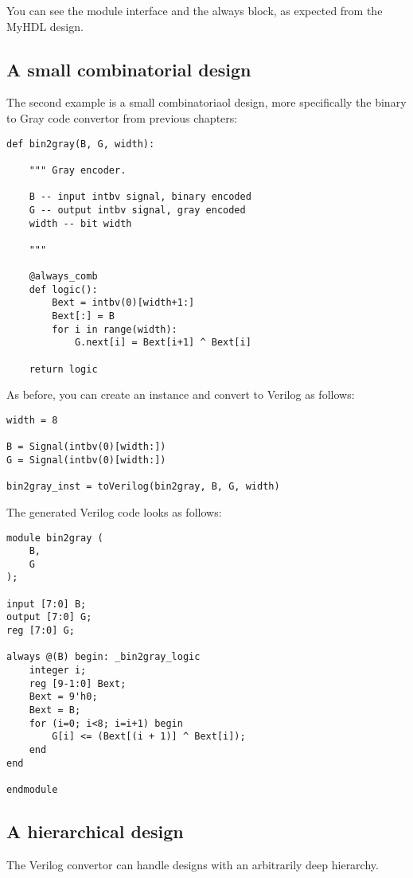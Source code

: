 You can see the module interface and the always block, as expected
from the MyHDL design. 

\subsection{A small combinatorial design\label{conv-usage-comb}}

The second example is a small combinatoriaol design, more
specifically the binary to Gray code convertor from previous chapters:

\begin{verbatim}
def bin2gray(B, G, width):
    
    """ Gray encoder.

    B -- input intbv signal, binary encoded
    G -- output intbv signal, gray encoded
    width -- bit width
    
    """

    @always_comb
    def logic():
        Bext = intbv(0)[width+1:]
        Bext[:] = B
        for i in range(width):
            G.next[i] = Bext[i+1] ^ Bext[i]

    return logic
\end{verbatim}

As before, you can create an instance and convert to
Verilog as follows:

\begin{verbatim}
width = 8

B = Signal(intbv(0)[width:])
G = Signal(intbv(0)[width:])

bin2gray_inst = toVerilog(bin2gray, B, G, width)
 \end{verbatim}

The generated Verilog code looks as follows:

\begin{verbatim}
module bin2gray (
    B,
    G
);

input [7:0] B;
output [7:0] G;
reg [7:0] G;

always @(B) begin: _bin2gray_logic
    integer i;
    reg [9-1:0] Bext;
    Bext = 9'h0;
    Bext = B;
    for (i=0; i<8; i=i+1) begin
        G[i] <= (Bext[(i + 1)] ^ Bext[i]);
    end
end

endmodule
\end{verbatim}

\subsection{A hierarchical design\label{conv-usage-hier}}
The Verilog convertor can handle designs with an
arbitrarily deep hierarchy.

